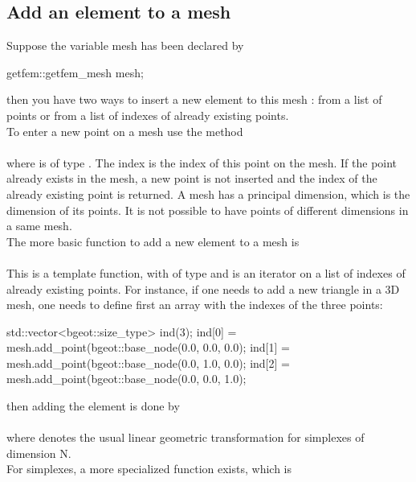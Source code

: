 \documentclass[11pt,a4paper]{article}
\begin{document}
\subsection{Add an element to a mesh}
Suppose the variable mesh has been declared by
\begin{cppcode}
  getfem::getfem\_mesh mesh;
\end{cppcode}
then you have two ways to insert a new element to this mesh : from a list of points or from a list of indexes of already existing points.\\[0.5cm]
To enter a new point on a mesh use the method\\[0.5cm]
\\[0.5cm]
where  is of type . The index  is the index of this point on the mesh. If the point already exists in the mesh, a new point is not inserted and the index of the already existing point is returned. A mesh has a principal dimension, which is the dimension of its points. It is not possible to have points of different dimensions in a same mesh.\\[0.5cm]
The more basic function to add a new element to a mesh is\\[0.5cm]
\\[0.5cm]
This is a template function, with  of type  and  is an iterator on a list of indexes of already existing points. For instance, if one needs to add a new triangle in a 3D mesh, one needs to define first an array with the indexes of the three points:\\[0.5cm]
\begin{cppcode}
  std::vector<bgeot::size\_type> ind(3);
  ind[0] = mesh.add\_point(bgeot::base\_node(0.0, 0.0, 0.0);
  ind[1] = mesh.add\_point(bgeot::base\_node(0.0, 1.0, 0.0);
  ind[2] = mesh.add\_point(bgeot::base\_node(0.0, 0.0, 1.0);
\end{cppcode}
then adding the element is done by\\[0.5cm]
\\[0.5cm]
where  denotes the usual linear geometric transformation for simplexes of dimension N.\\[0.5cm]
For simplexes, a more specialized function exists, which is\\[0.5cm]
\\[0.5cm]
\end{document}
